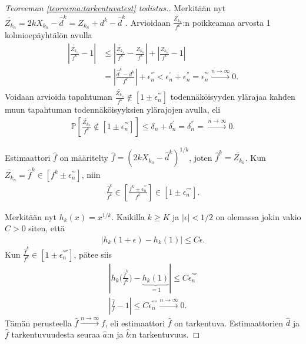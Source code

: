 \documentclass[finnish,12pt,a4paper,pdftex,sci,utf8]{aaltothesis}
\begin{document}
\begin{proof}[Teoreeman \ref{teoreema:tarkentuvatest} todistus.]
	Merkitään nyt $\tilde{Z_{k_n}} = 2kX_{k_n} - \hat{d}^k = Z_{k_n} + d^k - \hat{d}^k$. Arvioidaan $\frac{\tilde{Z_{k_n}}}{f^k}$:n poikkeamaa arvosta 1 kolmioepäyhtälön avulla 
	\begin{align*}
		|\frac{\tilde{Z_{k_n}}}{f^k} - 1| &\leq |\frac{\tilde{Z_{k_n}}}{f^k} - \frac{Z_{k_n}}{f^k}| + |\frac{Z_{k_n}}{f^k} - 1| \\
		& = |\frac{\hat{d}^k - d^k}{f^k}| + \epsilon_{n}^{''} < \epsilon_{n}^{'} + \epsilon_{n}^{''} = \epsilon_{n}^{'''} \xrightarrow{n \rightarrow \infty} 0.
	\end{align*}
	Voidaan arvioida tapahtuman $\frac{\tilde{Z_{k_n}}}{f^k} \notin [1 \pm \epsilon_{n}^{'''}]$ todennäköisyyden ylärajaa kahden muun tapahtuman todennäköisyyksien ylärajojen avulla, eli
	\begin{align*}
		\mathbb{P}[\frac{\tilde{Z_{k_n}}}{f^k} \notin [1 \pm \epsilon_{n}^{'''}]] \leq \delta_{n} + \delta_{n}^{'} = \delta_{n}^{''} = \xrightarrow{n \rightarrow \infty} 0.
	\end{align*}

	Estimaattori $\hat{f}$ on määritelty $\hat{f} = (2kX_{k_n} - \hat{d}^k)^{1/k}$, joten $\hat{f}^k = \tilde{Z_{k_n}}$. Kun \\ $\tilde{Z_{k_n}} = \hat{f}^k \in [f^k \pm \epsilon_{n}^{'''}]$, niin 
	\begin{align*}
		\frac{\hat{f}^k}{f^k} \in [\frac{{f}^k \pm \epsilon_{n}^{'''}}{f^k}] \in [1 \pm \epsilon_{n}^{''''}].
	\end{align*}

	Merkitään nyt $h_k(x) = x^{1/k}$. Kaikilla $k \geq K$ ja $|\epsilon| < 1/2$ on olemassa jokin vakio $C > 0$ siten, että
	\begin{align*}
		|h_k(1+\epsilon) - h_k(1)| \leq C \epsilon.
	\end{align*}
	Kun $\frac{\hat{f}^k}{f^k} \in [1 \pm \epsilon_{n}^{''''}]$, pätee siis
	\begin{align*}
		|h_k \big(\frac{\hat{f}^k}{f^k} \big) - \underbrace{h_k(1)}_{= 1} | \leq C \epsilon_{n}^{''''} \\
		|\frac{\hat{f}}{f} - 1| \leq C \epsilon_{n}^{''''} \xrightarrow{n \rightarrow \infty} 0.
	\end{align*}
	Tämän perusteella $\hat{f} \xrightarrow{n \rightarrow \infty} f$, eli estimaattori $\hat{f}$ on tarkentuva. 
	Estimaattorien $\hat{d}$ ja$\hat{f}$ tarkentuvuudesta seuraa $\hat{a}$:n ja $\hat{b}$:n tarkentuvuus.
\end{proof}

\clearpage
\end{document}
